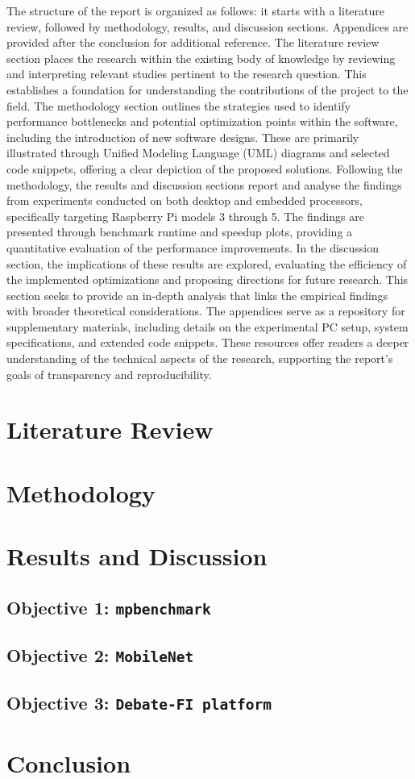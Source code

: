 \documentclass[12pt]{article}
\begin{document}
The structure of the report is organized as follows: it starts with a literature review, followed by methodology, results, and discussion sections. Appendices are provided after the conclusion for additional reference. The literature review section places the research within the existing body of knowledge by reviewing and interpreting relevant studies pertinent to the research question. This establishes a foundation for understanding the contributions of the project to the field. The methodology section outlines the strategies used to identify performance bottlenecks and potential optimization points within the software, including the introduction of new software designs. These are primarily illustrated through Unified Modeling Language (UML) diagrams and selected code snippets, offering a clear depiction of the proposed solutions. Following the methodology, the results and discussion sections report and analyse the findings from experiments conducted on both desktop and embedded processors, specifically targeting Raspberry Pi models 3 through 5. The findings are presented through benchmark runtime and speedup plots, providing a quantitative evaluation of the performance improvements. In the discussion section, the implications of these results are explored, evaluating the efficiency of the implemented optimizations and proposing directions for future research. This section seeks to provide an in-depth analysis that links the empirical findings with broader theoretical considerations. The appendices serve as a repository for supplementary materials, including details on the experimental PC setup, system specifications, and extended code snippets. These resources offer readers a deeper understanding of the technical aspects of the research, supporting the report's goals of transparency and reproducibility. 

\newpage
\section{Literature Review}


\section{Methodology}


\section{Results and Discussion}

\subsection{Objective 1: \texttt{mpbenchmark}}
\subsection{Objective 2: \texttt{MobileNet}}
\subsection{Objective 3: \texttt{Debate-FI platform}}

\section{Conclusion}



\end{document}
